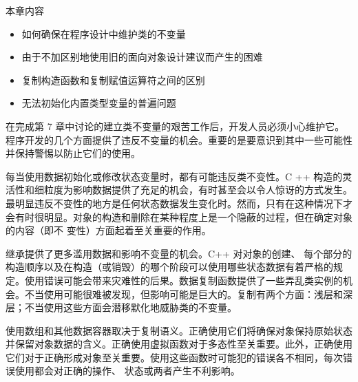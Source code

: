 本章内容

\begin{itemize}
\item
如何确保在程序设计中维护类的不变量

\item
由于不加区别地使用旧的面向对象设计建议而产生的困难

\item
复制构造函数和复制赋值运算符之间的区别

\item
无法初始化内置类型变量的普遍问题
\end{itemize}

在完成第 7 章中讨论的建立类不变量的艰苦工作后，开发人员必须小心维护它。程序开发的几个方面提供了违反不变量的机会。重要的是要意识到其中一些可能性并保持警惕以防止它们的使用。

每当使用数据初始化或修改状态变量时，都有可能违反类不变性。C ++ 构造的灵活性和细粒度为影响数据提供了充足的机会，有时甚至会以令人惊讶的方式发生。最明显违反不变性的地方是任何状态数据发生变化时。然而，只有在这种情况下才会有时很明显。对象的构造和删除在某种程度上是一个隐蔽的过程，但在确定对象的内容（即不 变性）方面起着至关重要的作用。

继承提供了更多滥用数据和影响不变量的机会。C++ 对对象的创建、 每个部分的构造顺序以及在构造（或销毁）的哪个阶段可以使用哪些状态数据有着严格的规定。使用错误可能会带来灾难性的后果。数据复制函数提供了一些弄乱类实例的机会。不当使用可能很难被发现，但影响可能是巨大的。复制有两个方面：浅层和深层；不当使用这些方面会潜移默化地威胁类的不变量。

使用数组和其他数据容器取决于复制语义。正确使用它们将确保对象保持原始状态并保留对象数据的含义。正确使用虚拟函数对于多态性至关重要。此外，正确使用它们对于正确形成对象至关重要。使用这些函数时可能犯的错误各不相同，每次错误使用都会对正确的操作、 状态或两者产生不利影响。
